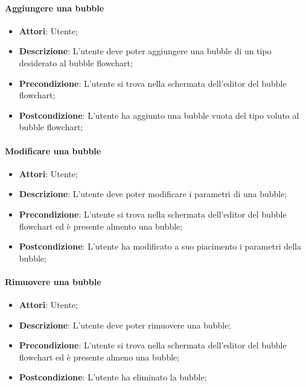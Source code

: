 
\paragraph{Aggiungere una bubble}
\begin{itemize}
	\item \textbf{Attori}: Utente;
	\item \textbf{Descrizione}: L'utente deve poter aggiungere una bubble di un tipo desiderato al bubble flowchart;
	\item \textbf{Precondizione}: L'utente si trova nella schermata dell'editor del bubble flowchart;
	\item \textbf{Postcondizione}: L'utente ha aggiunto una bubble vuota del tipo voluto al bubble flowchart;
\end{itemize}

\paragraph{Modificare una bubble}
\begin{itemize}
	\item \textbf{Attori}: Utente;
	\item \textbf{Descrizione}: L'utente deve poter modificare i parametri di una bubble;
	\item \textbf{Precondizione}: L'utente si trova nella schermata dell'editor del bubble flowchart ed è presente almento una bubble;
	\item \textbf{Postcondizione}: L'utente ha modificato a suo piacimento i parametri della bubble;
\end{itemize}

\paragraph{Rimuovere una bubble}
\begin{itemize}
	\item \textbf{Attori}: Utente;
	\item \textbf{Descrizione}: L'utente deve poter rimuovere una bubble;
	\item \textbf{Precondizione}: L'utente si trova nella schermata dell'editor del bubble flowchart ed è presente almeno una bubble;
	\item \textbf{Postcondizione}: L'utente ha eliminato la bubble;
\end{itemize}

